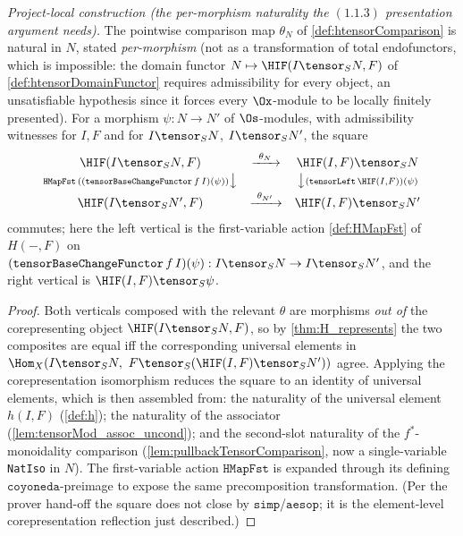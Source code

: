\begin{lemma}

  \label{lem:htensorComparison_naturality}
  \textit{Project-local construction (the per-morphism naturality the $(1.1.3)$
  presentation argument needs).}
  The pointwise comparison map $\theta_N$ of \cref{def:htensorComparison} is natural in
  $N$, stated \emph{per-morphism} (not as a transformation of total endofunctors, which
  is impossible: the domain functor $N \mapsto \HIF(I \tensor_S N, F)$ of
  \cref{def:htensorDomainFunctor} requires admissibility for every object, an
  unsatisfiable hypothesis since it forces every $\Ox$-module to be locally finitely
  presented). For a morphism $\psi : N \to N'$ of $\Os$-modules, with admissibility
  witnesses for $I, F$ and for $I \tensor_S N$, $I \tensor_S N'$, the square
  \[
    \begin{array}{ccc}
      \HIF(I \tensor_S N, F) & \xrightarrow{\ \theta_N\ } & \HIF(I,F) \tensor_S N \\[2pt]
      {\scriptstyle \mathtt{HMapFst}\,((\mathtt{tensorBaseChangeFunctor}\,f\,I)(\psi))}
        \big\downarrow & & \big\downarrow {\scriptstyle (\mathtt{tensorLeft}\,\HIF(I,F))(\psi)} \\[2pt]
      \HIF(I \tensor_S N', F) & \xrightarrow{\ \theta_{N'}\ } & \HIF(I,F) \tensor_S N'
    \end{array}
  \]
  commutes; here the left vertical is the first-variable action \cref{def:HMapFst} of
  $H(-,F)$ on $(\mathtt{tensorBaseChangeFunctor}\,f\,I)(\psi) : I \tensor_S N \to
  I \tensor_S N'$, and the right vertical is $\HIF(I,F) \tensor_S \psi$.
  \begin{proof}
    Both verticals composed with the relevant $\theta$ are morphisms \emph{out of} the
    corepresenting object $\HIF(I \tensor_S N, F)$, so by \cref{thm:H_represents} the two
    composites are equal iff the corresponding universal elements in
    $\Hom_X(I \tensor_S N,\ F \tensor_S (\HIF(I,F) \tensor_S N'))$ agree. Applying the
    corepresentation isomorphism reduces the square to an identity of universal elements,
    which is then assembled from: the naturality of the universal element $h(I,F)$
    (\cref{def:h}); the naturality of the associator
    (\cref{lem:tensorMod_assoc_uncond}); and the second-slot naturality of the
    $f^*$-monoidality comparison (\cref{lem:pullbackTensorComparison}, now a
    single-variable \texttt{NatIso} in $N$). The first-variable action $\mathtt{HMapFst}$
    is expanded through its defining $\mathtt{coyoneda}$-preimage to expose the same
    precomposition transformation. (Per the prover hand-off the square does not close by
    $\mathtt{simp}$/$\mathtt{aesop}$; it is the element-level corepresentation reflection
    just described.)
  \end{proof}
\end{lemma}

